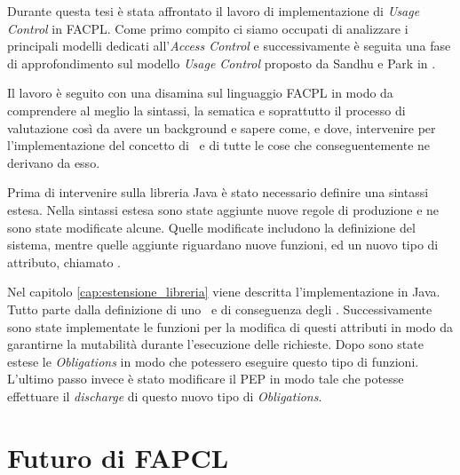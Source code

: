 \label{cap:conclusioni}
Durante questa tesi è stata affrontato il lavoro di implementazione di \textit{Usage Control} in FACPL.
Come primo compito ci siamo occupati di analizzare i principali modelli dedicati all'\textit{Access Control} e successivamente è seguita una fase di approfondimento sul modello \textit{Usage Control} proposto da Sandhu e Park in \cite{SurveyUsageControl}. \\ \par
Il lavoro è seguito con una disamina sul linguaggio FACPL in modo da comprendere al meglio la sintassi, la sematica e soprattutto il processo di valutazione così da avere un background e sapere come, e dove, intervenire per l'implementazione del concetto di \status \ e di tutte le cose che conseguentemente ne derivano da esso.\\ \par
Prima di intervenire sulla libreria Java è stato necessario definire una sintassi estesa. Nella sintassi estesa sono state aggiunte nuove regole di produzione e ne sono state modificate alcune. Quelle modificate includono la definizione del sistema, mentre quelle aggiunte riguardano nuove funzioni, ed un nuovo tipo di attributo, chiamato \statusattribute.\\ \par
Nel capitolo \ref{cap:estensione_libreria} viene descritta l'implementazione in Java. Tutto parte dalla definizione di uno \status \ e di conseguenza degli \statusattribute. Successivamente sono state implementate le funzioni per la modifica di questi attributi in modo da garantirne la mutabilità durante l'esecuzione delle richieste. Dopo sono state estese le \textit{Obligations} in modo che potessero eseguire questo tipo di funzioni. L'ultimo passo invece è stato modificare il PEP in modo tale che potesse effettuare il \textit{discharge} di questo nuovo tipo di \textit{Obligations}.
\section{Futuro di FAPCL}
\label{sec:futuro}
